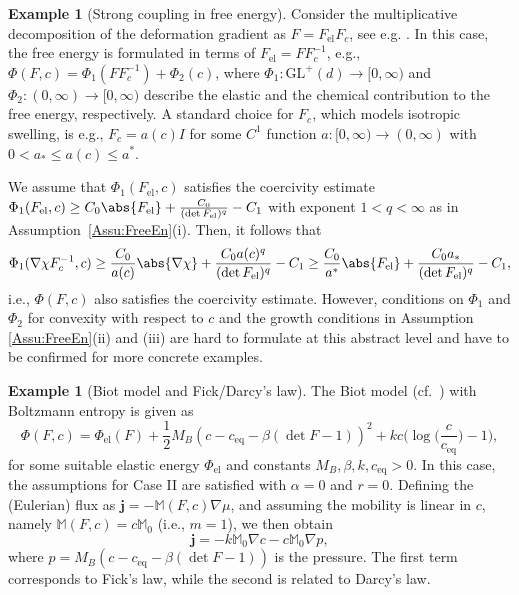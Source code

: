 \documentclass[a4paper,12pt]{article}
\newcommand{\el}{\text{el}}
\newcommand{\eq}{\text{eq}}
\newcommand{\M}{\mathbb{M}}
\newcommand{\GL}{\mathrm{GL}}
\theoremstyle{plain}
\theoremstyle{definition}
\newtheorem{Ex}[Th]{Example}
\numberwithin{equation}{section}
\begin{document}
    \begin{Ex}[Strong coupling in free energy] Consider the multiplicative decomposition of the deformation gradient as $F=F_\el F_c$, see e.g. \cite{Luba2004CTMD}. In this case, the free energy is formulated in terms of $F_\el = FF_c^{-1}$, e.g., $\Phi(F,c) = \Phi_1(FF^{-1}_c)+ \Phi_2(c)$, where $\Phi_1:\GL^+(d)\to [0,\infty)$ and $\Phi_2:(0,\infty)\to [0,\infty)$ describe the elastic and the chemical contribution to the free energy, respectively.
    A standard choice for $F_c$, which models isotropic swelling, 
    is e.g., $F_c = a(c)I$ for some $C^1$ function $a:[0,\infty)\to(0,\infty)$ with $0<a_*\leq a(c)\leq a^*$.
    
    We assume that $\Phi_1(F_\el,c)$ satisfies the coercivity estimate $\Phi_1(F_\el,c)\geq C_0\abs{F_\el} + \frac{C_0}{(\det F_\el)^q} - C_1$ with exponent $1<q<\infty$ as in Assumption~\ref{Assu:FreeEn}(i).
    Then, it follows that 
    \[
    \Phi_1(\nabla\chi F_c^{-1},c) 
\geq \frac{C_0}{a(c)}\abs{\nabla\chi} + \frac{C_0a(c)^q}{(\det F_\el)^q} - C_1\geq \frac{C_0}{a^*}\abs{F_\el} + \frac{C_0a_*}{(\det F_\el)^q} - C_1, 
    \]
    i.e., $\Phi(F,c)$ also satisfies the coercivity estimate. However, conditions on $\Phi_1$ and $\Phi_2$ for convexity with respect to $c$ and the growth conditions in Assumption \ref{Assu:FreeEn}(ii) and (iii) are hard to formulate at this abstract level and have to be confirmed for more concrete examples.
    
        
    \end{Ex}


	\begin{Ex}[Biot model and Fick/Darcy's law]
	\label{Ex:BiotFickDarcy}
	The Biot model \cite{Biot1941GTo3dC} (cf.\ \cite[Sect.~4]{RouTom2020DCEB})
	with Boltzmann entropy is given as	
	\begin{equation*}
	\Phi(F,c) = \Phi_\el(F) + \frac{1}{2}M_B(c-c_\eq-\beta(\det F{-}1))^2 
	+ k c\big(\log\big(\frac{c}{c_\eq}\big)-1\big),
	\end{equation*}
	for some suitable elastic energy $\Phi_\el$ and constants $M_B,\beta,k, c_\eq>0$. In this case, the assumptions for Case II are satisfied with $\alpha=0$ and $r=0$. Defining the (Eulerian) flux as $\boldsymbol{j}=-\M(F,c)\nabla\mu$, and assuming the mobility is linear in $c$, namely $\M(F,c)=c\M_0$ (i.e., $m=1$), we then obtain
	\[
		\boldsymbol{j}=-k\M_0 \nabla c - c\M_0\nabla p, 
	\]
	where $p=M_B(c-c_\eq - \beta(\det F{-}1))$ is the pressure. The first term corresponds to Fick's law, while the second is related 
	to Darcy's law.
%
\end{Ex}	
\end{document}

